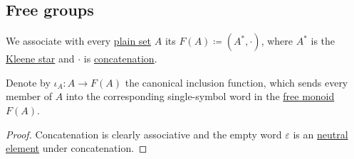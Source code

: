 \subsection{Free groups}\label{subsec:free_groups}

\begin{definition}\label{def:free_monoid}
  We associate with every \hyperref[def:set]{plain set} \( A \) its  \( F(A) \coloneqq (A^*, \cdot) \), where \( A^* \) is the \hyperref[def:formal_language/kleene_star]{Kleene star} and \( \cdot \) is \hyperref[def:formal_language/concatenation]{concatenation}.

  Denote by \( \iota_A: A \to F(A) \) the canonical inclusion function, which sends every member of \( A \) into the corresponding single-symbol word in the \hyperref[def:free_monoid]{free monoid} \( F(A) \).
\end{definition}
\begin{proof}
  Concatenation is clearly associative and the empty word \( \varepsilon \) is an \hyperref[def:monoid]{neutral element} under concatenation.
\end{proof}

